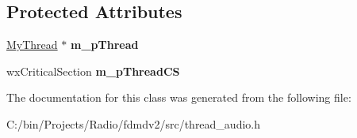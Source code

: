 \subsection*{Protected Attributes}
\begin{DoxyCompactItemize}
\item 
\hypertarget{class_my_frame_a7c3bc828e14d2fffdf2a71ea31b54ee1}{\hyperlink{class_my_thread}{My\-Thread} $\ast$ {\bfseries m\-\_\-p\-Thread}}\label{class_my_frame_a7c3bc828e14d2fffdf2a71ea31b54ee1}

\item 
\hypertarget{class_my_frame_a1a458e34841ff600e9aafae51212a2c3}{wx\-Critical\-Section {\bfseries m\-\_\-p\-Thread\-C\-S}}\label{class_my_frame_a1a458e34841ff600e9aafae51212a2c3}

\end{DoxyCompactItemize}


The documentation for this class was generated from the following file\-:\begin{DoxyCompactItemize}
\item 
C\-:/bin/\-Projects/\-Radio/fdmdv2/src/thread\-\_\-audio.\-h\end{DoxyCompactItemize}
